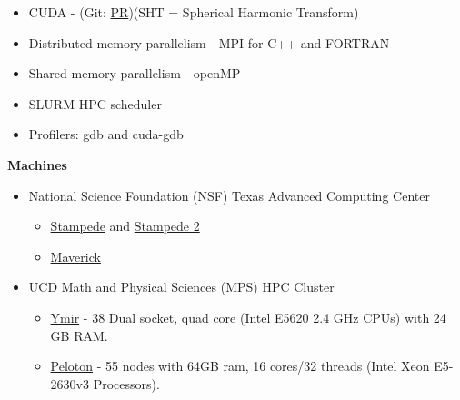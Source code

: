 \documentclass[11pt]{ltxdoc}
\begin{document}
\begin{description}
\begin{description}
\begin{itemize}
          \item CUDA - (Git: \href{https://github.com/geodynamics/calypso/pull/3}{PR})(SHT = Spherical Harmonic Transform)
                   
          \item Distributed memory parallelism - MPI for C++ and FORTRAN
      
          \item Shared memory parallelism - openMP
          
          \item SLURM HPC scheduler
          
          \item Profilers: gdb and cuda-gdb
      
      \end{itemize}
      
    \item[] \textbf{Machines}
    
      \vskip 06pt 
      
      \begin{itemize}
        
        \item National Science Foundation (NSF) Texas Advanced Computing Center
      
      \begin{itemize}
      	
        \item \href{https://portal.xsede.org/tacc-stampede}{Stampede} and \href{https://portal.xsede.org/tacc-stampede2}{Stampede 2}
        
        \item \href{https://portal.xsede.org/tacc-maverick}{Maverick} 
        
      \end{itemize}
  
      \item UCD Math and Physical Sciences (MPS) HPC Cluster
      
        \begin{itemize}
      	
          \item \href{https://wiki.cse.ucdavis.edu/support/systems/ymir}{Ymir} - 38 Dual socket, quad core (Intel E5620 2.4 GHz CPUs) with 24 GB RAM.
        
          \item \href{https://wiki.cse.ucdavis.edu/support/systems/peloton}{Peloton} - 55 nodes with 64GB ram, 16 cores/32 threads (Intel Xeon E5-2630v3 Processors).
        

\end{itemize}
\end{itemize}
\end{description}
\end{description}
\end{document}
